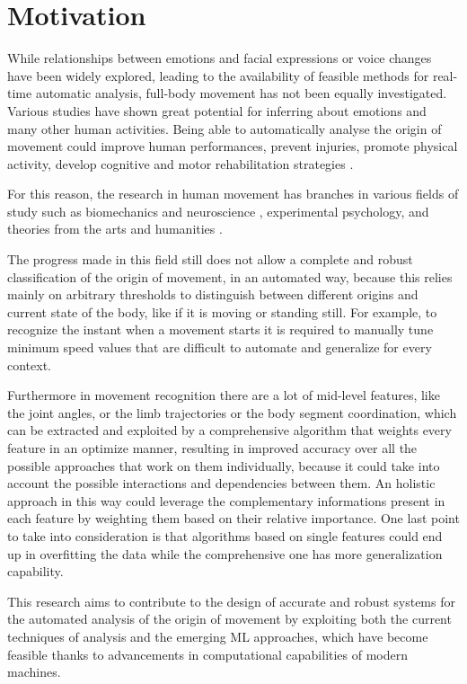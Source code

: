 \chapter{Motivation}

While relationships between emotions and facial expressions or voice changes have been widely explored, 
leading to the availability of feasible methods for real-time automatic analysis, 
full-body movement has not been equally investigated. 
Various studies have shown great potential for inferring about emotions and many other human activities. 
Being able to automatically analyse the origin of movement could improve human performances, 
prevent injuries, promote physical activity, develop cognitive and motor rehabilitation strategies \cite{piana:2016}. 

For this reason, the research in human movement has branches in various fields of study such as biomechanics and neuroscience \cite{vaessen:2019}, 
experimental psychology, and theories from the arts and humanities \cite{camurri:2016}. 

The progress made in this field still does not allow a complete and robust classification of the origin of movement, in an automated way, 
because this relies mainly on arbitrary thresholds to distinguish between different origins and current state of the body, 
like if it is moving or standing still. 
For example, to recognize the instant when a movement starts it is required to manually tune 
minimum speed values that are difficult to automate and generalize for every context. 

Furthermore in movement recognition there are a lot of mid-level features, like the joint angles,
or the limb trajectories or the body segment coordination, which can be extracted and exploited by a comprehensive algorithm 
that weights every feature in an optimize manner, resulting in improved accuracy over all the possible approaches 
that work on them individually, because it could take into account the possible interactions and dependencies between them. 
An holistic approach in this way could leverage the complementary informations present in each feature by weighting them 
based on their relative importance. 
One last point to take into consideration is that algorithms based on single features could end up in overfitting the data
while the comprehensive one has more generalization capability. 

This research aims to contribute to the design of accurate and robust systems for the automated analysis of the origin of movement
by exploiting both the current techniques of analysis and the emerging ML approaches, 
which have become feasible thanks to advancements in computational capabilities of modern machines. 

